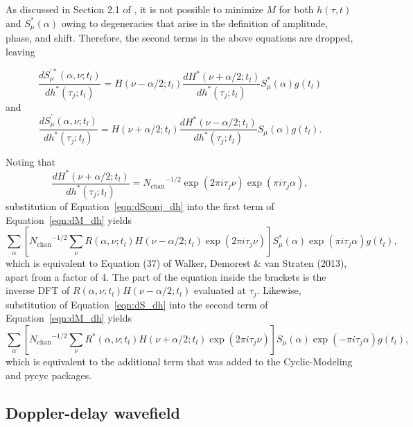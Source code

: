 \documentclass[manuscript]{aastex631}
\newcommand{\Nchan}{\ensuremath{N_\mathrm{chan}}}
\newcommand{\Eqn}[1]{Equation~\ref{eqn:#1}}
\begin{document}
As discussed in Section 2.1 of \cite{wdv13}, it is not possible to minimize $M$ for both $h(\tau,t)$
and $S_\mu^*(\alpha)$ owing to degeneracies that arise in the definition of amplitude, phase, and shift.
Therefore, the second terms in the above equations are dropped, leaving

\begin{equation}
\frac{dS_\mu^{\prime*}(\alpha,\nu;t_l)}{dh^*(\tau_j;t_l)}
    = H(\nu-\alpha/2;t_l) \frac{dH^*(\nu+\alpha/2;t_l)}{dh^*(\tau_j;t_l)} S_\mu^*(\alpha) g(t_l)
\label{eqn:dSconj_dh}
\end{equation}
%
and
\begin{equation}
\frac{dS^\prime_\mu(\alpha,\nu;t_l)}{dh^*(\tau_j;t_l)}
    = H(\nu+\alpha/2;t_l) \frac{dH^*(\nu-\alpha/2;t_l)}{dh^*(\tau_j;t_l)} S_\mu(\alpha) g(t_l).
\label{eqn:dS_dh}
\end{equation}


Noting that
\begin{equation}
    \frac{dH^*(\nu+\alpha/2;t_l)}{dh^*(\tau_j;t_l)} = \Nchan^{-1/2} \exp(2\pi i \tau_j \nu) \exp(\pi i \tau_j \alpha),
\end{equation}
%
substitution of \Eqn{dSconj_dh} into the first term of \Eqn{dM_dh} yields
\begin{equation}
\sum_\alpha \left[ \Nchan^{-1/2} \sum_\nu R(\alpha,\nu;t_l) H(\nu-\alpha/2;t_l) \exp(2\pi i \tau_j \nu) \right] S_\mu^*(\alpha) \exp(\pi i \tau_j \alpha) g(t_l),
\end{equation}
%
which is equivalent to Equation (37) of Walker, Demorest \& van Straten (2013), apart from a factor of 4.
The part of the equation inside the brackets is the inverse DFT of
%
$R(\alpha,\nu;t_l)H(\nu-\alpha/2;t_l)$ 
%
evaluated at $\tau_j$.
%
Likewise, substitution of \Eqn{dS_dh} into the second term of \Eqn{dM_dh} yields
\begin{equation}
\sum_\alpha \left[ \Nchan^{-1/2} \sum_\nu R^*(\alpha,\nu;t_l) H(\nu+\alpha/2;t_l) \exp(2\pi i \tau_j \nu) \right] S_\mu(\alpha) \exp(-\pi i \tau_j \alpha) g(t_l),
\end{equation}
%
which is equivalent to the additional term that was added to the Cyclic-Modeling and pycyc packages.




\subsection{Doppler-delay wavefield}
\end{document}
